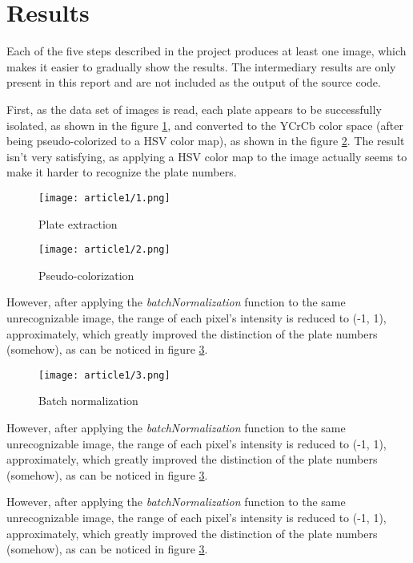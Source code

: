 \documentclass[11pt]{IEEEtran}
\begin{document}
\section{Results}

Each of the five steps described in the project \cite{task1} produces at least one image, which makes it easier to gradually show the results. The intermediary results are only present in this report and are not included as the output of the source code.

First, as the data set of images is read, each plate appears to be successfully isolated, as shown in the figure \ref{1}, and converted to the YCrCb color space (after being pseudo-colorized to a HSV color map), as shown in the figure \ref{2}. The result isn't very satisfying, as applying a HSV color map to the image actually seems to make it harder to recognize the plate numbers.

\begin{figure}[h!]
    \centering
    \texttt{[image: article1/1.png]}
    \caption{Plate extraction}
    \label{1}
\end{figure}

\begin{figure}[h!]
    \centering
    \texttt{[image: article1/2.png]}
    \caption{Pseudo-colorization}
    \label{2}
\end{figure}

However, after applying the \textit{batchNormalization} function to the same unrecognizable image, the range of each pixel's intensity is reduced to (-1, 1), approximately, which greatly improved the distinction of the plate numbers (somehow), as can be noticed in figure \ref{3}.

\begin{figure}[h!]
    \centering
    \texttt{[image: article1/3.png]}
    \caption{Batch normalization}
    \label{3}
\end{figure}

However, after applying the \textit{batchNormalization} function to the same unrecognizable image, the range of each pixel's intensity is reduced to (-1, 1), approximately, which greatly improved the distinction of the plate numbers (somehow), as can be noticed in figure \ref{3}.

However, after applying the \textit{batchNormalization} function to the same unrecognizable image, the range of each pixel's intensity is reduced to (-1, 1), approximately, which greatly improved the distinction of the plate numbers (somehow), as can be noticed in figure \ref{3}.
\end{document}
